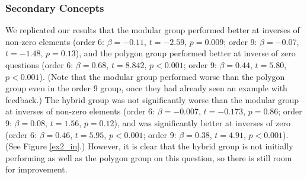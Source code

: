 \documentclass[11pt]{article}
\begin{document}
\subsubsection{Secondary Concepts}
We replicated our results that the modular group performed better at inverses of non-zero elements (order 6: $\beta = -0.11$, $t = -2.59$, $p = 0.009$; order 9: $\beta = -0.07$, $t = -1.48$, $p = 0.13$), and the polygon group performed better at inverse of zero questions (order 6: $\beta = 0.68$, $t = 8.842$, $p < 0.001$; order 9: $\beta = 0.44$, $t = 5.80$, $p < 0.001$). (Note that the modular group performed worse than the polygon group even in the order 9 group, once they had already seen an example with feedback.) The hybrid group was not significantly worse than the modular group at inverses of non-zero elements (order 6: $\beta = -0.007$, $t = -0.173$, $p = 0.86$; order 9: $\beta = 0.08$, $t = 1.56$, $p = 0.12$), and was significantly better at inverses of zero (order 6: $\beta = 0.46$, $t = 5.95$, $p < 0.001$; order 9: $\beta = 0.38$, $t = 4.91$, $p < 0.001$). (See Figure \ref{ex2_in}.) However, it is clear that the hybrid group is not initially performing as well as the polygon group on this question, so there is still room for improvement. \\[11pt] 
\end{document}
